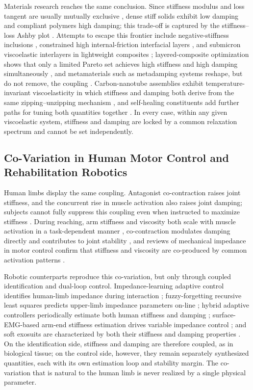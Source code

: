 ﻿\documentclass[conference]{IEEEtran}
\begin{document}
Materials research reaches the same conclusion. Since stiffness modulus and
loss tangent are usually mutually exclusive \cite{unwin2018escaping}, dense
stiff solids exhibit low damping and compliant polymers high damping; this
trade-off is captured by the stiffness--loss Ashby plot
\cite{tsimouri2024lightweight}. Attempts to escape this frontier include
negative-stiffness inclusions \cite{lakes2001extreme}, constrained high
internal-friction interfacial layers \cite{unwin2018escaping}, and submicron
viscoelastic interlayers in lightweight composites
\cite{tsimouri2024lightweight}; layered-composite optimization shows that
only a limited Pareto set achieves high stiffness and high damping
simultaneously \cite{meaud2013analysis}, and metamaterials such as
metadamping systems reshape, but do not remove, the coupling
\cite{hussein2013metadamping}. Carbon-nanotube assemblies exhibit
temperature-invariant viscoelasticity in which stiffness and damping both
derive from the same zipping--unzipping mechanism \cite{xu2010carbon}, and
self-healing constituents add further paths for tuning both quantities
together \cite{feng2025review}. In every case, within any given viscoelastic
system, stiffness and damping are locked by a common relaxation spectrum and
cannot be set independently.

\subsection{Co-Variation in Human Motor Control and Rehabilitation Robotics}
Human limbs display the same coupling. Antagonist co-contraction raises
joint stiffness, and the concurrent rise in muscle activation also raises
joint damping; subjects cannot fully suppress this coupling even when
instructed to maximize stiffness \cite{milner1995inability}. During reaching,
arm stiffness and viscosity both scale with muscle activation in a
task-dependent manner \cite{gomi1998task}, co-contraction modulates damping
directly and contributes to joint stability \cite{heitmann2011muscle}, and
reviews of mechanical impedance in motor control confirm that stiffness and
viscosity are co-produced by common activation patterns
\cite{mizrahi2015mechanical}.

Robotic counterparts reproduce this co-variation, but only through coupled
identification and dual-loop control. Impedance-learning adaptive control
identifies human-limb impedance during interaction \cite{sharifi2022impedance};
fuzzy-forgetting recursive least squares predicts upper-limb impedance
parameters on-line \cite{tao2023research}; hybrid adaptive controllers
periodically estimate both human stiffness and damping
\cite{jiang2024impedance}; surface-EMG-based arm-end stiffness estimation
drives variable impedance control \cite{wang2025adaptive}; and soft exosuits
are characterized by both their stiffness and damping properties
\cite{bottin2024characterization}. On the identification side, stiffness and
damping are therefore coupled, as in biological tissue; on the control side,
however, they remain separately synthesized quantities, each with its own
estimation loop and stability margin. The co-variation that is natural to
the human limb is never realized by a single physical parameter.
\end{document}
